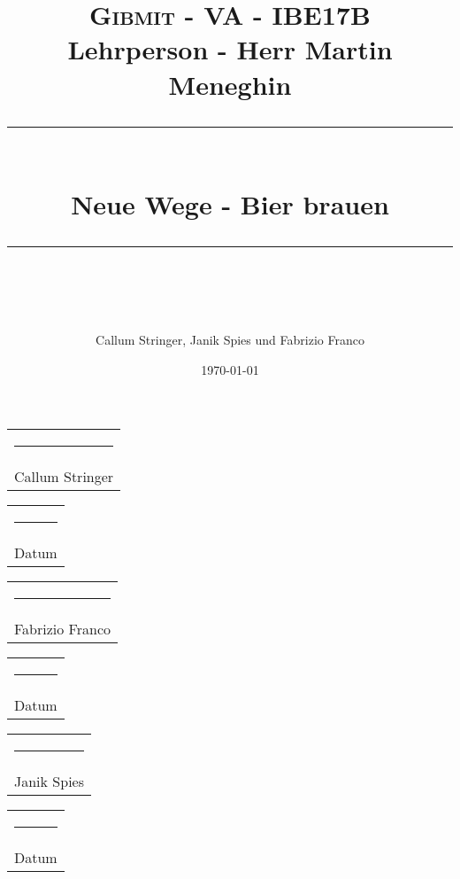 \documentclass[12pt]{scrartcl}
\title{	
	\normalfont\small
	\textsc{Gibmit - VA - IBE17B}\\ 
	{Lehrperson - Herr Martin Meneghin}
	\vspace{25pt} 
	\rule{\linewidth}{0.5pt}\\
	\vspace{16pt} 
	{\huge Neue Wege - Bier brauen}\\ 
	\vspace{10pt} 
	\rule{\linewidth}{2pt}\\ 
	\author{\large Callum Stringer, Janik Spies und Fabrizio Franco} 
	\vspace{12pt} 
	\date{\small\today} 
}
\begin{document}
\maketitle
\thispagestyle{empty}
\newpage
\tableofcontents














\nocite{*}
\printbibliography[title={Quellenverzeichnis}]

\listoffigures

\renewcommand{\listfigurename}{Abbildungsverzeichnis}
\renewcommand{\listtablename}{Tabellenverzeichnis}


\vspace*{4em}\noindent
\hfill%
\begin{tabular}[t]{c}
	\rule{10em}{0.4pt} \\ Callum Stringer
\end{tabular}%
\hfill%
\begin{tabular}[t]{c}
	\rule{10em}{0.4pt} \\ Datum
\end{tabular}%
\hfill\strut

\vspace*{4em}\noindent
\hfill%
\begin{tabular}[t]{c}
	\rule{10em}{0.4pt} \\ Fabrizio Franco
\end{tabular}%
\hfill%
\begin{tabular}[t]{c}
	\rule{10em}{0.4pt} \\ Datum
\end{tabular}%
\hfill\strut

\vspace*{4em}\noindent
\hfill%
\begin{tabular}[t]{c}
	\rule{10em}{0.4pt} \\ Janik Spies
\end{tabular}%
\hfill%
\begin{tabular}[t]{c}
	\rule{10em}{0.4pt} \\ Datum
\end{tabular}%
\hfill\strut
\end{document}
